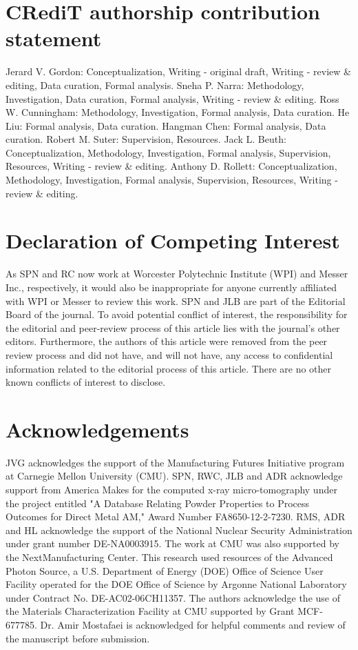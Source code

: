 \documentclass[10pt]{article}
\begin{document}
\section*{CRediT authorship contribution statement}
Jerard V. Gordon: Conceptualization, Writing - original draft, Writing - review \& editing, Data curation, Formal analysis. Sneha P. Narra: Methodology, Investigation, Data curation, Formal analysis, Writing - review \& editing. Ross W. Cunningham: Methodology, Investigation, Formal analysis, Data curation. He Liu: Formal analysis, Data curation. Hangman Chen: Formal analysis, Data curation. Robert M. Suter: Supervision, Resources. Jack L. Beuth: Conceptualization, Methodology, Investigation, Formal analysis, Supervision, Resources, Writing - review \& editing. Anthony D. Rollett: Conceptualization, Methodology, Investigation, Formal analysis, Supervision, Resources, Writing - review \& editing.

\section*{Declaration of Competing Interest}
As SPN and RC now work at Worcester Polytechnic Institute (WPI) and Messer Inc., respectively, it would also be inappropriate for anyone currently affiliated with WPI or Messer to review this work. SPN and JLB are part of the Editorial Board of the journal. To avoid potential conflict of interest, the responsibility for the editorial and peer-review process of this article lies with the journal's other editors. Furthermore, the authors of this article were removed from the peer review process and did not have, and will not have, any access to confidential information related to the editorial process of this article. There are no other known conflicts of interest to disclose.

\section*{Acknowledgements}
JVG acknowledges the support of the Manufacturing Futures Initiative program at Carnegie Mellon University (CMU). SPN, RWC, JLB and ADR acknowledge support from America Makes for the computed x-ray micro-tomography under the project entitled "A Database Relating Powder Properties to Process Outcomes for Direct Metal AM," Award Number FA8650-12-2-7230. RMS, ADR and HL acknowledge the support of the National Nuclear Security Administration under grant number DE-NA0003915. The work at CMU was also supported by the NextManufacturing Center. This research used resources of the Advanced Photon Source, a U.S. Department of Energy (DOE) Office of Science User Facility operated for the DOE Office of Science by Argonne National Laboratory under Contract No. DE-AC02-06CH11357. The authors acknowledge the use of the Materials Characterization Facility at CMU supported by Grant MCF-677785. Dr. Amir Mostafaei is acknowledged for helpful comments and review of the manuscript before submission.
\end{document}

